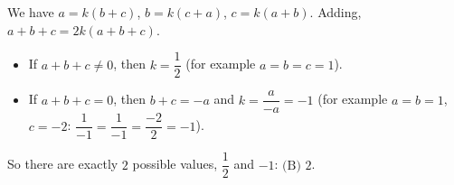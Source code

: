 We have $a=k(b+c)$, $b=k(c+a)$, $c=k(a+b)$. Adding, $a+b+c=2k(a+b+c)$.
\begin{itemize}
\item If $a+b+c\ne0$, then $k=\dfrac{1}{2}$ (for example $a=b=c=1$).
\item If $a+b+c=0$, then $b+c=-a$ and $k=\dfrac{a}{-a}=-1$ (for example $a=b=1$, $c=-2$: $\dfrac{1}{-1}=\dfrac{1}{-1}=\dfrac{-2}{2}=-1$).
\end{itemize}
So there are exactly $2$ possible values, $\dfrac{1}{2}$ and $-1$: $\boxed{\text{(B) } 2}$.
